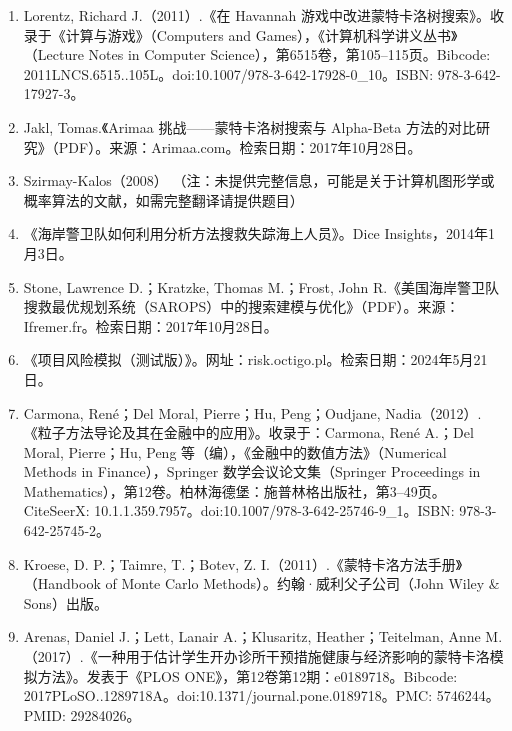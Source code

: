 \begin{enumerate}
\item Lorentz, Richard J.（2011）.《在 Havannah 游戏中改进蒙特卡洛树搜索》。收录于《计算与游戏》（Computers and Games），《计算机科学讲义丛书》（Lecture Notes in Computer Science），第6515卷，第105–115页。Bibcode: 2011LNCS.6515..105L。doi:10.1007/978-3-642-17928-0_10。ISBN: 978-3-642-17927-3。
\item Jakl, Tomas.《Arimaa 挑战——蒙特卡洛树搜索与 Alpha-Beta 方法的对比研究》（PDF）。来源：Arimaa.com。检索日期：2017年10月28日。
\item Szirmay-Kalos（2008）
（注：未提供完整信息，可能是关于计算机图形学或概率算法的文献，如需完整翻译请提供题目）
\item 《海岸警卫队如何利用分析方法搜救失踪海上人员》。Dice Insights，2014年1月3日。
\item Stone, Lawrence D.；Kratzke, Thomas M.；Frost, John R.《美国海岸警卫队搜救最优规划系统（SAROPS）中的搜索建模与优化》（PDF）。来源：Ifremer.fr。检索日期：2017年10月28日。
\item 《项目风险模拟（测试版）》。网址：risk.octigo.pl。检索日期：2024年5月21日。
\item Carmona, René；Del Moral, Pierre；Hu, Peng；Oudjane, Nadia（2012）.《粒子方法导论及其在金融中的应用》。收录于：Carmona, René A.；Del Moral, Pierre；Hu, Peng 等（编），《金融中的数值方法》（Numerical Methods in Finance），Springer 数学会议论文集（Springer Proceedings in Mathematics），第12卷。柏林海德堡：施普林格出版社，第3–49页。CiteSeerX: 10.1.1.359.7957。doi:10.1007/978-3-642-25746-9_1。ISBN: 978-3-642-25745-2。
\item Kroese, D. P.；Taimre, T.；Botev, Z. I.（2011）.《蒙特卡洛方法手册》（Handbook of Monte Carlo Methods）。约翰·威利父子公司（John Wiley & Sons）出版。
\item Arenas, Daniel J.；Lett, Lanair A.；Klusaritz, Heather；Teitelman, Anne M.（2017）.《一种用于估计学生开办诊所干预措施健康与经济影响的蒙特卡洛模拟方法》。发表于《PLOS ONE》，第12卷第12期：e0189718。Bibcode: 2017PLoSO..1289718A。doi:10.1371/journal.pone.0189718。PMC: 5746244。PMID: 29284026。

\end{enumerate}